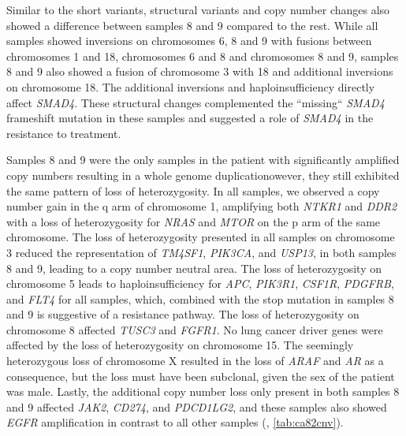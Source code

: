 Similar to the short variants, structural variants and copy number changes also showed a difference between samples 8 and 9 compared to the rest. While all samples showed inversions on chromosomes 6, 8 and 9 with fusions between chromosomes 1 and 18, chromosomes 6 and 8 and chromosomes 8 and 9, samples 8 and 9 also showed a fusion of chromosome 3 with 18 and additional inversions on chromosome 18. The additional inversions and haploinsufficiency directly affect \textit{SMAD4}. These structural changes complemented the ``missing`` \textit{SMAD4} frameshift mutation in these samples and suggested a  role of \textit{SMAD4} in the resistance to treatment.

Samples 8 and 9 were the only samples in the patient with significantly amplified copy numbers resulting in a whole genome duplicationowever, they still exhibited the same pattern of loss of heterozygosity. In all samples, we observed a copy number gain in the q arm of chromosome 1, amplifying both \textit{NTKR1} and \textit{DDR2} with a loss of heterozygosity for \textit{NRAS} and \textit{MTOR} on the p arm of the same chromosome. The loss of heterozygosity presented in all samples on chromosome 3 reduced the representation of \textit{TM4SF1}, \textit{PIK3CA}, and \textit{USP13},  in both samples 8 and 9, leading to a copy number neutral area. The loss of heterozygosity on chromosome 5 leads to  haploinsufficiency for \textit{APC}, \textit{PIK3R1}, \textit{CSF1R}, \textit{PDGFRB}, and \textit{FLT4} for all samples, which, combined with the stop mutation in samples 8 and 9 is suggestive of a  resistance pathway. The loss of heterozygosity on chromosome 8 affected \textit{TUSC3} and \textit{FGFR1}. No lung cancer driver genes were affected by the loss of heterozygosity on chromosome 15. The seemingly heterozygous loss of chromosome X resulted in the loss of \textit{ARAF} and \textit{AR} as a consequence, but the loss must have been subclonal, given  the sex of the patient was male. Lastly, the additional copy number loss only present in both samples 8 and 9 affected \textit{JAK2}, \textit{CD274}, and \textit{PDCD1LG2}, and these samples also showed \textit{EGFR} amplification in contrast to all other samples (,  \autoref{tab:ca82cnv}). 


